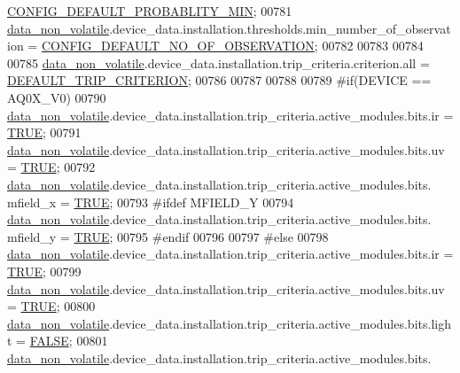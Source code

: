 \begin{DoxyCode}
      \hyperlink{a00021_a599be42d4b357badb7c9b16a124a186a}{CONFIG\_DEFAULT\_PROBABLITY\_MIN};
00781         \hyperlink{a00060_a76ac5f917f5308dcd83de0d7c94559fb}{data\_non\_volatile}.device\_data.installation.thresholds.min\_number\_of\_observation = 
      \hyperlink{a00021_af69b35a9f07bfcfe500538565d898c65}{CONFIG\_DEFAULT\_NO\_OF\_OBSERVATION};
00782 
00783 
00784 
00785         \hyperlink{a00060_a76ac5f917f5308dcd83de0d7c94559fb}{data\_non\_volatile}.device\_data.installation.trip\_criteria.criterion.all          = 
      \hyperlink{a00022_a0ff9495f8521ea7698e83e7b4d6a6985}{DEFAULT\_TRIP\_CRITERION};
00786 
00787 
00788         
00789 \textcolor{preprocessor}{#if(DEVICE == AQ0X\_V0)}
00790         \hyperlink{a00060_a76ac5f917f5308dcd83de0d7c94559fb}{data\_non\_volatile}.device\_data.installation.trip\_criteria.active\_modules.bits.ir   
              = \hyperlink{a00040_aa8cecfc5c5c054d2875c03e77b7be15d}{TRUE};
00791         \hyperlink{a00060_a76ac5f917f5308dcd83de0d7c94559fb}{data\_non\_volatile}.device\_data.installation.trip\_criteria.active\_modules.bits.uv   
              = \hyperlink{a00040_aa8cecfc5c5c054d2875c03e77b7be15d}{TRUE};
00792         \hyperlink{a00060_a76ac5f917f5308dcd83de0d7c94559fb}{data\_non\_volatile}.device\_data.installation.trip\_criteria.active\_modules.bits.
      mfield\_x     = \hyperlink{a00040_aa8cecfc5c5c054d2875c03e77b7be15d}{TRUE};
00793 \textcolor{preprocessor}{        #ifdef MFIELD\_Y}
00794         \hyperlink{a00060_a76ac5f917f5308dcd83de0d7c94559fb}{data\_non\_volatile}.device\_data.installation.trip\_criteria.active\_modules.bits.
      mfield\_y     = \hyperlink{a00040_aa8cecfc5c5c054d2875c03e77b7be15d}{TRUE};
00795 \textcolor{preprocessor}{        #endif}
00796 
00797 \textcolor{preprocessor}{#else}
00798         \hyperlink{a00060_a76ac5f917f5308dcd83de0d7c94559fb}{data\_non\_volatile}.device\_data.installation.trip\_criteria.active\_modules.bits.ir   
              = \hyperlink{a00040_aa8cecfc5c5c054d2875c03e77b7be15d}{TRUE};
00799         \hyperlink{a00060_a76ac5f917f5308dcd83de0d7c94559fb}{data\_non\_volatile}.device\_data.installation.trip\_criteria.active\_modules.bits.uv   
              = \hyperlink{a00040_aa8cecfc5c5c054d2875c03e77b7be15d}{TRUE};
00800         \hyperlink{a00060_a76ac5f917f5308dcd83de0d7c94559fb}{data\_non\_volatile}.device\_data.installation.trip\_criteria.active\_modules.bits.light
              = \hyperlink{a00040_aa93f0eb578d23995850d61f7d61c55c1}{FALSE};
00801         \hyperlink{a00060_a76ac5f917f5308dcd83de0d7c94559fb}{data\_non\_volatile}.device\_data.installation.trip\_criteria.active\_modules.bits.

\end{DoxyCode}
